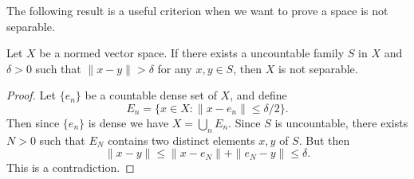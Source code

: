 The following result is a useful criterion when we want to prove a space is not separable.
\begin{proposition}\label{NVS not separable if uncountable family}
Let $X$ be a normed vector space. If there exists a uncountable family $S$ in $X$ and $\delta>0$ such that $\|x-y\|>\delta$ for any $x,y\in S$, then $X$ is not separable.
\end{proposition}
\begin{proof}
Let $\{e_n\}$ be a countable dense set of $X$, and define
\[E_n=\{x\in X:\|x-e_n\|\leq\delta/2\}.\]
Then since $\{e_n\}$ is dense we have $X=\bigcup_nE_n$. Since $S$ is uncountable, there exists $N>0$ such that $E_{N}$ contains two distinct elements $x,y$ of $S$. But then
\[\|x-y\|\leq\|x-e_N\|+\|e_N-y\|\leq\delta.\]
This is a contradiction.
\end{proof}
